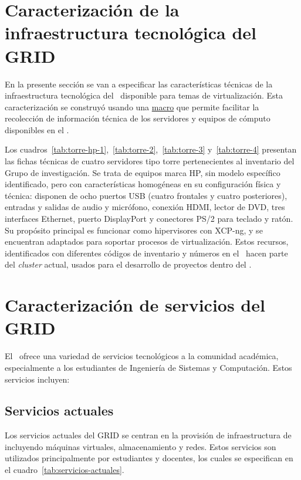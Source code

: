 \section{Caracterización de la infraestructura tecnológica del GRID}
En la presente sección se van a especificar las características técnicas de la infraestructura tecnológica del \GRID\ disponible para temas de virtualización. Esta caracterización se construyó usando una \href{https://docs.google.com/spreadsheets/d/14NBv72ucVTrLqGIldYdIsjdBGt3QlgwcblcVRis-DaQ/edit?usp=sharing}{macro} que permite facilitar la recolección de información técnica de los servidores y equipos de cómputo disponibles en el \GRID.

Los cuadros~\ref{tab:torre-hp-1},~\ref{tab:torre-2},~\ref{tab:torre-3} y~\ref{tab:torre-4} presentan las fichas técnicas de cuatro servidores tipo torre pertenecientes al inventario del Grupo de investigación. Se trata de equipos marca HP, sin modelo específico identificado, pero con características homogéneas en su configuración física y técnica: disponen de ocho puertos USB (cuatro frontales y cuatro posteriores), entradas y salidas de audio y micrófono, conexión HDMI, lector de DVD, tres interfaces Ethernet, puerto DisplayPort y conectores PS/2 para teclado y ratón. Su propósito principal es funcionar como hipervisores con XCP-ng, y se encuentran adaptados para soportar procesos de virtualización. Estos recursos, identificados con diferentes códigos de inventario y números en el \CPD\, hacen parte del \textit{cluster} actual, usados para el desarrollo de proyectos dentro del \GRID.


\section{Caracterización de servicios del GRID}
El \GRID\ ofrece una variedad de servicios tecnológicos a la comunidad académica, especialmente a los estudiantes de Ingeniería de Sistemas y Computación. Estos servicios incluyen:

\subsection{Servicios actuales}
Los servicios actuales del GRID se centran en la provisión de infraestructura de \TI\, incluyendo máquinas virtuales, almacenamiento y redes. Estos servicios son utilizados principalmente por estudiantes y docentes, los cuales se especifican en el cuadro~\ref{tab:servicios-actuales}.

